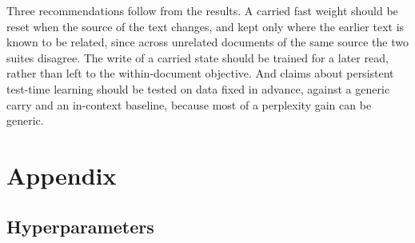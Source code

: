 \documentclass[12pt,a4paper]{report}
\begin{document}
Three recommendations follow from the results. A carried fast weight should be reset when the source of the text changes, and kept only where the earlier text is known to be related, since across unrelated documents of the same source the two suites disagree. The write of a carried state should be trained for a later read, rather than left to the within-document objective. And claims about persistent test-time learning should be tested on data fixed in advance, against a generic carry and an in-context baseline, because most of a perplexity gain can be generic.

\cleardoublepage
{}
{}



\chapter*{Appendix}
\setcounter{section}{0}
\renewcommand{\thesection}{A.\arabic{section}}
\setcounter{table}{0}
\renewcommand{\thetable}{A.\arabic{table}}
\setcounter{figure}{0}
\renewcommand{\thefigure}{A.\arabic{figure}}

\section{Hyperparameters}
\label{app-hparams}
\end{document}
